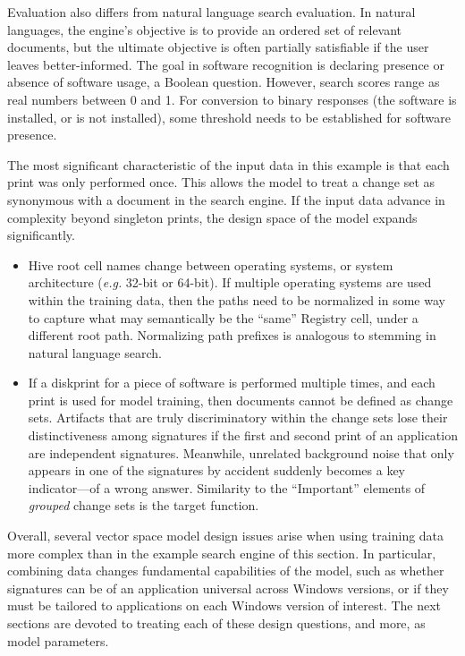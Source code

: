 \documentclass[11pt]{ucthesis}
\theoremstyle{plain}
\theoremstyle{definition}
\newcommand{\eg}{\emph{e.g.}\xspace}
\begin{document}
Evaluation also differs from natural language search evaluation.  In natural languages, the engine's objective is to provide an ordered set of relevant documents, but the ultimate objective is often partially satisfiable if the user leaves better-informed.   The goal in software recognition is declaring presence or absence of software usage, a Boolean question.  However, search scores range as real numbers between 0 and 1.  For conversion to binary responses (the software is installed, or is not installed), some threshold needs to be established for software presence.

The most significant characteristic of the input data in this example is that each print was only performed once.  This allows the model to treat a change set as synonymous with a document in the search engine.  If the input data advance in complexity beyond singleton prints, the design space of the model expands significantly.

\begin{itemize}
\item Hive root cell names change between operating systems, or system architecture (\eg 32-bit or 64-bit).  If multiple operating systems are used within the training data, then the paths need to be normalized in some way to capture what may semantically be the ``same'' Registry cell, under a different root path.  Normalizing path prefixes is analogous to stemming in natural language search.
\item If a diskprint for a piece of software is performed multiple times, and each print is used for model training, then documents cannot be defined as change sets.  Artifacts that are truly discriminatory within the change sets lose their distinctiveness among signatures if the first and second print of an application are independent signatures.  Meanwhile, unrelated background noise that only appears in one of the signatures by accident suddenly becomes a key indicator---of a wrong answer.  Similarity to the ``Important'' elements of \emph{grouped} change sets is the target function.
\end{itemize}

Overall, several vector space model design issues arise when using training data more complex than in the example search engine of this section.  In particular, combining data changes fundamental capabilities of the model, such as whether signatures can be of an application universal across Windows versions, or if they must be tailored to applications on each Windows version of interest.  The next sections are devoted to treating each of these design questions, and more, as model parameters.
\end{document}
